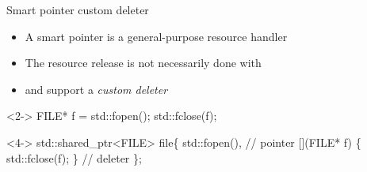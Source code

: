 \begin{frame}[fragile]{Smart pointer custom deleter}
  \begin{itemize}
  \item A smart pointer is a general-purpose resource handler
  \item The resource release is not necessarily done with 
  \item {} and  support a
    \textit{custom deleter}
  \end{itemize}

  \begin{codeblock}<2->{
FILE* f = std::fopen(\ddd);
\ddd
std::fclose(f);}\end{codeblock}


  \begin{codeblock}<4->{
std::shared_ptr<FILE> file\{
    std::fopen(\ddd),                 // pointer
    [](FILE* f) \{ std::fclose(f); \} // deleter
\};}\end{codeblock}

\end{frame}

